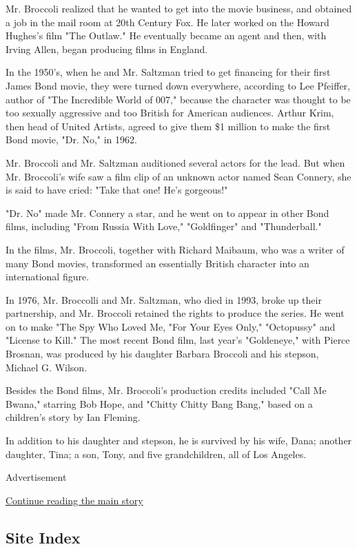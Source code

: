 Mr. Broccoli realized that he wanted to get into the movie business, and
obtained a job in the mail room at 20th Century Fox. He later worked on
the Howard Hughes's film "The Outlaw." He eventually became an agent and
then, with Irving Allen, began producing films in England.

In the 1950's, when he and Mr. Saltzman tried to get financing for their
first James Bond movie, they were turned down everywhere, according to
Lee Pfeiffer, author of "The Incredible World of 007," because the
character was thought to be too sexually aggressive and too British for
American audiences. Arthur Krim, then head of United Artists, agreed to
give them \$1 million to make the first Bond movie, "Dr. No," in 1962.

Mr. Broccoli and Mr. Saltzman auditioned several actors for the lead.
But when Mr. Broccoli's wife saw a film clip of an unknown actor named
Sean Connery, she is said to have cried: "Take that one! He's gorgeous!"

"Dr. No" made Mr. Connery a star, and he went on to appear in other Bond
films, including "From Russia With Love," "Goldfinger" and
"Thunderball."

In the films, Mr. Broccoli, together with Richard Maibaum, who was a
writer of many Bond movies, transformed an essentially British character
into an international figure.

In 1976, Mr. Broccolli and Mr. Saltzman, who died in 1993, broke up
their partnership, and Mr. Broccoli retained the rights to produce the
series. He went on to make "The Spy Who Loved Me, "For Your Eyes Only,"
"Octopussy" and "License to Kill." The most recent Bond film, last
year's "Goldeneye," with Pierce Brosnan, was produced by his daughter
Barbara Broccoli and his stepson, Michael G. Wilson.

Besides the Bond films, Mr. Broccoli's production credits included "Call
Me Bwana," starring Bob Hope, and "Chitty Chitty Bang Bang," based on a
children's story by Ian Fleming.

In addition to his daughter and stepson, he is survived by his wife,
Dana; another daughter, Tina; a son, Tony, and five grandchildren, all
of Los Angeles.

Advertisement

\protect\hyperlink{after-bottom}{Continue reading the main story}

\hypertarget{site-index}{%
\subsection{Site Index}\label{site-index}}

